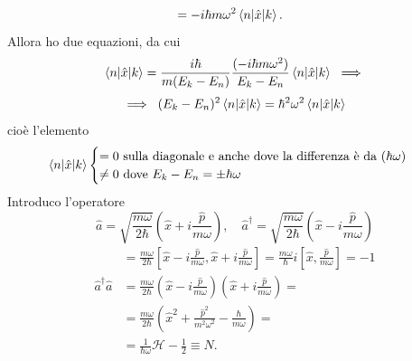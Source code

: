 \begin{enumerate}
\begin{align*}
&= -i\hbar m \omega^2 \braket{n|\hat{x}|k}.
\end{align*}
Allora ho due equazioni, da cui 
\[
\braket{n|\hat{x}|k} = \frac{i\hbar}{m(E_k - E_n)} \frac{(-i\hbar m \omega^2)}{E_k - E_n} \braket{n|\hat{x}|k} \; \implies
\]
\[
\implies \; (E_k - E_n)^2 \braket{n|\hat{x}|k} = \hbar^2\omega^2 \braket{n|\hat{x}|k}
\]
cioè l'elemento
\[
\braket{n|\hat{x}|k} \begin{cases}
= 0 \text{ sulla diagonale e anche dove la differenza è da } (\hbar \omega) \\
\neq 0 \text{ dove } E_k - E_n = \pm \hbar \omega
\end{cases}
\]
Introduco l'operatore
\[
\hat{a} = \sqrt{\frac{m\omega}{2\hbar}} \left( \hat{x} + i\frac{\hat{p}}{m\omega} \right), \quad \hat{a}^\dag = \sqrt{\frac{m\omega}{2\hbar}} \left( \hat{x} - i\frac{\hat{p}}{m\omega} \right)
\]
\begin{align*}
[\hat{a}^\dag, \hat{a}] &= \frac{m\omega}{2\hbar} \left[ \hat{x} - i\frac{\hat{p}}{m\omega}, \hat{x} + i\frac{\hat{p}}{m\omega} \right] = \frac{m\omega}{\hbar} i \left[ \hat{x}, \frac{\hat{p}}{m\omega} \right] = -1 \\
\hat{a}^\dag\hat{a} &= \frac{m\omega}{2\hbar} \left( \hat{x} - i\frac{\hat{p}}{m\omega} \right) \left( \hat{x} + i\frac{\hat{p}}{m\omega} \right) = \\
&= \frac{m\omega}{2\hbar} \left( \hat{x}^2 + \frac{\hat{p}^2}{m^2\omega^2} - \frac{\hbar}{m\omega} \right) = \\
&= \frac{1}{\hbar\omega} \mathcal{H} - \frac{1}{2} \equiv N.
\end{align*}
\end{enumerate}